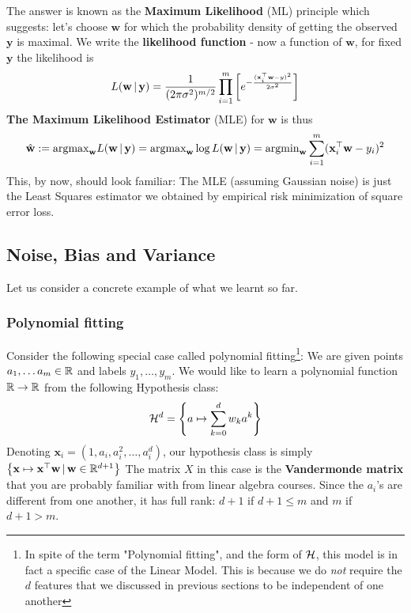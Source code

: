 The answer is known as the {\bf Maximum Likelihood} (ML) principle which suggests: let's choose $\mathbf{w}$ for which the probability density of getting the observed $\mathbf{y}$ is maximal.
We write the {\bf likelihood function} - now a function of  $\mathbf{w}$, for fixed $\mathbf{y}$ the likelihood is
          \[
            L(\mathbf{w}\, |\, \mathbf{y}) = \frac{1}{(2\pi \sigma^2)^{m/2}}
            \prod_{i=1}^m \left[ e^{-\frac{(\mathbf{x}_i^{\top} \mathbf{w}-y)^2}{2\sigma^2}}\right]
          \]
\textbf{The Maximum Likelihood Estimator} (MLE) for $\mathbf{w}$ is thus
          \[
            \hat{\mathbf{w}}:=\text{argmax}_\mathbf{w} L(\mathbf{w}\, |\, \mathbf{y}) =
            \text{argmax}_\mathbf{w} \log L(\mathbf{w}\, |\, \mathbf{y}) =
            \text{argmin}_\mathbf{w} \sum_{i=1}^m(\mathbf{x}_i^{\top} \mathbf{w} -y_i)^2
          \]
This, by now, should look familiar: The MLE (assuming Gaussian noise) is just the Least Squares estimator we obtained by empirical risk minimization of square error loss.


\subsection{Noise, Bias and Variance}

Let us consider a concrete example of what we learnt so far.

\subsubsection{Polynomial fitting}

Consider the following special case called polynomial fitting\footnote{In spite of the term "Polynomial fitting", and the form of $\mathcal{H}$, this model is in fact a specific case of the Linear Model.
This is because we do \emph{not} require the $d$ features that we discussed in previous sections to be independent of one another}:
We are given points $a_1,\ldots a_m\in \mathbb{R}$  and labels $y_1,\ldots,y_m$.
We would like to learn a polynomial function $\mathbb{R}\to\mathbb{R}$ from the following Hypothesis class:
                \[
                  \mathcal{H}^d=\left\{ a\mapsto  \sum_{k=0}^d w_k a^k \right\}
                \]
 Denoting $\mathbf{x}_i=(1,a_i,a_i^2,\ldots,a_i^d)$, our hypothesis class is simply
                $\left\{ \mathbf{x}\mapsto \mathbf{x}^{\top} \mathbf{w}  \,|\,
                \mathbf{w}\in\mathbb{R}^{d+1}\right \}$
The matrix $X$ in this case is the \textbf{Vandermonde matrix} that you are probably familiar with from linear algebra courses. Since the $a_i$'s are different from one another, it has full rank:
$d+1$ if $d+1\leq m$ and $m$ if $d+1> m$.



